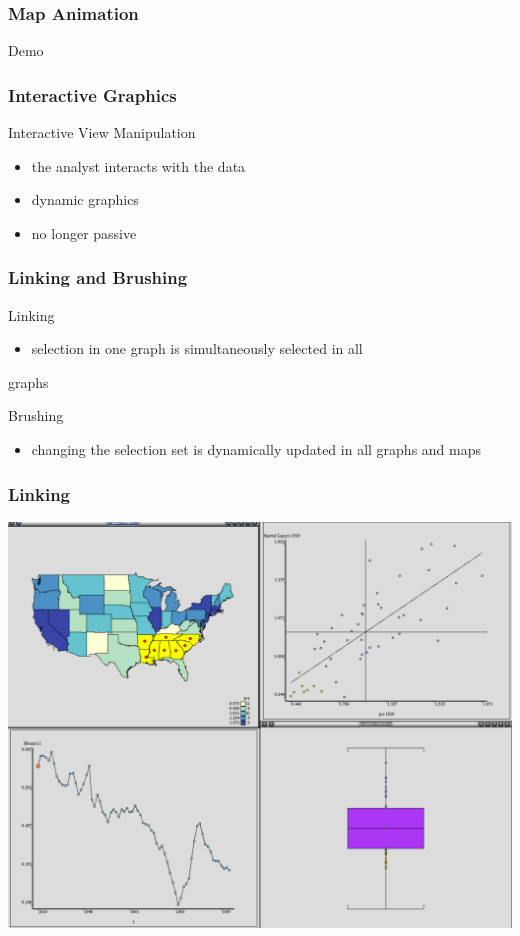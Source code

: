 \documentclass[nototal,handout]{beamer}
\begin{document}
\begin{frame}
	\frametitle{Map Animation}
 Demo
 \end{frame} 

\begin{frame}
	\frametitle{Interactive Graphics}
 
\begin{block}{Interactive View Manipulation}
 \begin{itemize}
 \item  the analyst interacts with the data
 \item  dynamic graphics
 \item  no longer passive
 \end{itemize}
 \end{block} \end{frame} 

\begin{frame}
	\frametitle{Linking and Brushing}
 
\begin{block}{Linking}
 \begin{itemize}
 \item  selection in one graph is simultaneously selected in all
 \end{itemize}
    graphs
 \end{block} 
\begin{block}{Brushing}
 \begin{itemize}
 \item  changing the selection set is dynamically updated in all graphs and maps
 \end{itemize}
 \end{block} \end{frame} 

\begin{frame}
	\frametitle{Linking}
 \begin{center}
 \includegraphics[width=.85\linewidth]{linking.pdf}
  \end{center}
 \end{frame} 
\end{document}
